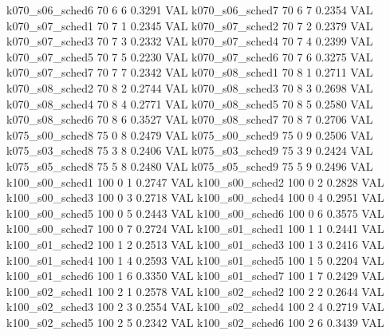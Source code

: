   k070_s06_sched6                   70    6   6    0.3291  VAL
  k070_s06_sched7                   70    6   7    0.2354  VAL
  k070_s07_sched1                   70    7   1    0.2345  VAL
  k070_s07_sched2                   70    7   2    0.2379  VAL
  k070_s07_sched3                   70    7   3    0.2332  VAL
  k070_s07_sched4                   70    7   4    0.2399  VAL
  k070_s07_sched5                   70    7   5    0.2230  VAL
  k070_s07_sched6                   70    7   6    0.3275  VAL
  k070_s07_sched7                   70    7   7    0.2342  VAL
  k070_s08_sched1                   70    8   1    0.2711  VAL
  k070_s08_sched2                   70    8   2    0.2744  VAL
  k070_s08_sched3                   70    8   3    0.2698  VAL
  k070_s08_sched4                   70    8   4    0.2771  VAL
  k070_s08_sched5                   70    8   5    0.2580  VAL
  k070_s08_sched6                   70    8   6    0.3527  VAL
  k070_s08_sched7                   70    8   7    0.2706  VAL
  k075_s00_sched8                   75    0   8    0.2479  VAL
  k075_s00_sched9                   75    0   9    0.2506  VAL
  k075_s03_sched8                   75    3   8    0.2406  VAL
  k075_s03_sched9                   75    3   9    0.2424  VAL
  k075_s05_sched8                   75    5   8    0.2480  VAL
  k075_s05_sched9                   75    5   9    0.2496  VAL
  k100_s00_sched1                  100    0   1    0.2747  VAL
  k100_s00_sched2                  100    0   2    0.2828  VAL
  k100_s00_sched3                  100    0   3    0.2718  VAL
  k100_s00_sched4                  100    0   4    0.2951  VAL
  k100_s00_sched5                  100    0   5    0.2443  VAL
  k100_s00_sched6                  100    0   6    0.3575  VAL
  k100_s00_sched7                  100    0   7    0.2724  VAL
  k100_s01_sched1                  100    1   1    0.2441  VAL
  k100_s01_sched2                  100    1   2    0.2513  VAL
  k100_s01_sched3                  100    1   3    0.2416  VAL
  k100_s01_sched4                  100    1   4    0.2593  VAL
  k100_s01_sched5                  100    1   5    0.2204  VAL
  k100_s01_sched6                  100    1   6    0.3350  VAL
  k100_s01_sched7                  100    1   7    0.2429  VAL
  k100_s02_sched1                  100    2   1    0.2578  VAL
  k100_s02_sched2                  100    2   2    0.2644  VAL
  k100_s02_sched3                  100    2   3    0.2554  VAL
  k100_s02_sched4                  100    2   4    0.2719  VAL
  k100_s02_sched5                  100    2   5    0.2342  VAL
  k100_s02_sched6                  100    2   6    0.3439  VAL
